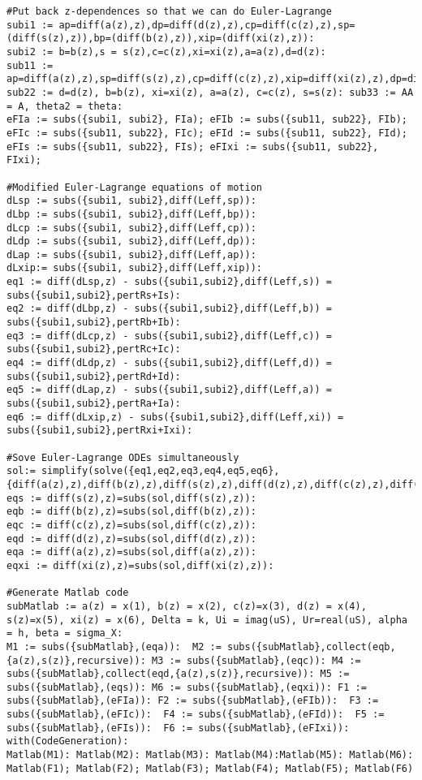 \begin{lstlisting}
#Put back z-dependences so that we can do Euler-Lagrange
subi1 := ap=diff(a(z),z),dp=diff(d(z),z),cp=diff(c(z),z),sp=(diff(s(z),z)),bp=(diff(b(z),z)),xip=(diff(xi(z),z)):
subi2 := b=b(z),s = s(z),c=c(z),xi=xi(z),a=a(z),d=d(z):
sub11 := ap=diff(a(z),z),sp=diff(s(z),z),cp=diff(c(z),z),xip=diff(xi(z),z),dp=diff(d(z),z),bp=diff(b(z),z):
sub22 := d=d(z), b=b(z), xi=xi(z), a=a(z), c=c(z), s=s(z): sub33 := AA = A, theta2 = theta: 
eFIa := subs({subi1, subi2}, FIa); eFIb := subs({sub11, sub22}, FIb); eFIc := subs({sub11, sub22}, FIc); eFId := subs({sub11, sub22}, FId); eFIs := subs({sub11, sub22}, FIs); eFIxi := subs({sub11, sub22}, FIxi);

#Modified Euler-Lagrange equations of motion 
dLsp := subs({subi1, subi2},diff(Leff,sp)):
dLbp := subs({subi1, subi2},diff(Leff,bp)):
dLcp := subs({subi1, subi2},diff(Leff,cp)):
dLdp := subs({subi1, subi2},diff(Leff,dp)):
dLap := subs({subi1, subi2},diff(Leff,ap)):
dLxip:= subs({subi1, subi2},diff(Leff,xip)):
eq1 := diff(dLsp,z) - subs({subi1,subi2},diff(Leff,s)) = subs({subi1,subi2},pertRs+Is):
eq2 := diff(dLbp,z) - subs({subi1,subi2},diff(Leff,b)) = subs({subi1,subi2},pertRb+Ib):
eq3 := diff(dLcp,z) - subs({subi1,subi2},diff(Leff,c)) = subs({subi1,subi2},pertRc+Ic):
eq4 := diff(dLdp,z) - subs({subi1,subi2},diff(Leff,d)) = subs({subi1,subi2},pertRd+Id):
eq5 := diff(dLap,z) - subs({subi1,subi2},diff(Leff,a)) = subs({subi1,subi2},pertRa+Ia):
eq6 := diff(dLxip,z) - subs({subi1,subi2},diff(Leff,xi)) = subs({subi1,subi2},pertRxi+Ixi):

#Sove Euler-Lagrange ODEs simultaneously 
sol:= simplify(solve({eq1,eq2,eq3,eq4,eq5,eq6},{diff(a(z),z),diff(b(z),z),diff(s(z),z),diff(d(z),z),diff(c(z),z),diff(xi(z),z)})):
eqs := diff(s(z),z)=subs(sol,diff(s(z),z)):
eqb := diff(b(z),z)=subs(sol,diff(b(z),z)):
eqc := diff(c(z),z)=subs(sol,diff(c(z),z)):
eqd := diff(d(z),z)=subs(sol,diff(d(z),z)):
eqa := diff(a(z),z)=subs(sol,diff(a(z),z)):
eqxi := diff(xi(z),z)=subs(sol,diff(xi(z),z)):

#Generate Matlab code
subMatlab := a(z) = x(1), b(z) = x(2), c(z)=x(3), d(z) = x(4), s(z)=x(5), xi(z) = x(6), Delta = k, Ui = imag(uS), Ur=real(uS), alpha = h, beta = sigma_X: 
M1 := subs({subMatlab},(eqa)):  M2 := subs({subMatlab},collect(eqb,{a(z),s(z)},recursive)): M3 := subs({subMatlab},(eqc)): M4 := subs({subMatlab},collect(eqd,{a(z),s(z)},recursive)): M5 := subs({subMatlab},(eqs)): M6 := subs({subMatlab},(eqxi)): F1 := subs({subMatlab},(eFIa)): F2 := subs({subMatlab},(eFIb)):  F3 := subs({subMatlab},(eFIc)):  F4 := subs({subMatlab},(eFId)):  F5 := subs({subMatlab},(eFIs)):  F6 := subs({subMatlab},(eFIxi)):
with(CodeGeneration):
Matlab(M1): Matlab(M2): Matlab(M3): Matlab(M4):Matlab(M5): Matlab(M6):
Matlab(F1); Matlab(F2); Matlab(F3); Matlab(F4); Matlab(F5); Matlab(F6)


\end{lstlisting}

